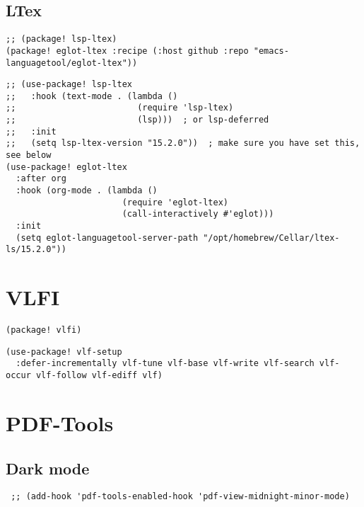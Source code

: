 \documentclass[c]{article}
\theoremstyle{plain}%
\theoremstyle{definition}
\theoremstyle{remark}
\begin{document}
\subsection{LTex}
\label{sec:orgaa97146}
\begin{verbatim}
;; (package! lsp-ltex)
(package! eglot-ltex :recipe (:host github :repo "emacs-languagetool/eglot-ltex"))
\end{verbatim}
\begin{verbatim}
;; (use-package! lsp-ltex
;;   :hook (text-mode . (lambda ()
;;                        (require 'lsp-ltex)
;;                        (lsp)))  ; or lsp-deferred
;;   :init
;;   (setq lsp-ltex-version "15.2.0"))  ; make sure you have set this, see below
(use-package! eglot-ltex
  :after org
  :hook (org-mode . (lambda ()
                       (require 'eglot-ltex)
                       (call-interactively #'eglot)))
  :init
  (setq eglot-languagetool-server-path "/opt/homebrew/Cellar/ltex-ls/15.2.0"))
\end{verbatim}
\section{VLFI}
\label{sec:org01fca61}
\begin{verbatim}
(package! vlfi)
\end{verbatim}
\begin{verbatim}
(use-package! vlf-setup
  :defer-incrementally vlf-tune vlf-base vlf-write vlf-search vlf-occur vlf-follow vlf-ediff vlf)
\end{verbatim}

\section{PDF-Tools}
\label{sec:orgf47a7ef}
\subsection{Dark mode}
\label{sec:orgdadbbd4}
\begin{verbatim}
 ;; (add-hook 'pdf-tools-enabled-hook 'pdf-view-midnight-minor-mode)
\end{verbatim}
\end{document}
